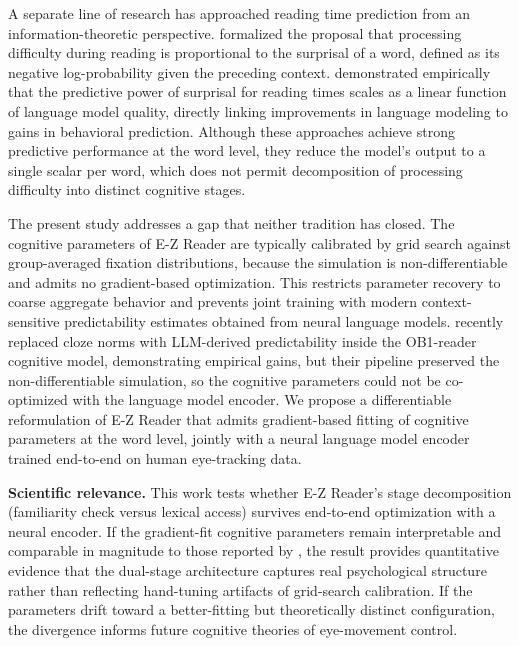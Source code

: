 \documentclass[12pt]{article}
\begin{document}
A separate line of research has approached reading time prediction from an
information-theoretic perspective. \citet{levy2008expectation} formalized the
proposal that processing difficulty during reading is proportional to the
surprisal of a word, defined as its negative log-probability given the
preceding context. \citet{goodkind2018predictive} demonstrated empirically
that the predictive power of surprisal for reading times scales as a linear
function of language model quality, directly linking improvements in language
modeling to gains in behavioral prediction. Although these approaches achieve
strong predictive performance at the word level, they reduce the model's output
to a single scalar per word, which does not permit decomposition of processing
difficulty into distinct cognitive stages.

The present study addresses a gap that neither tradition has closed. The
cognitive parameters of E-Z Reader are typically calibrated by grid search
against group-averaged fixation distributions, because the simulation is
non-differentiable and admits no gradient-based optimization. This restricts
parameter recovery to coarse aggregate behavior and prevents joint training
with modern context-sensitive predictability estimates obtained from neural
language models. \citet{lopesrego2024language} recently replaced cloze norms
with LLM-derived predictability inside the OB1-reader cognitive model,
demonstrating empirical gains, but their pipeline preserved the
non-differentiable simulation, so the cognitive parameters could not be
co-optimized with the language model encoder. We propose a differentiable
reformulation of E-Z Reader that admits gradient-based fitting of cognitive
parameters at the word level, jointly with a neural language model encoder
trained end-to-end on human eye-tracking data.

\noindent\textbf{Scientific relevance.} This work tests whether E-Z Reader's
stage decomposition (familiarity check versus lexical access) survives
end-to-end optimization with a neural encoder. If the gradient-fit cognitive
parameters remain interpretable and comparable in magnitude to those reported
by \citet{reichle1998toward}, the result provides quantitative evidence that
the dual-stage architecture captures real psychological structure rather than
reflecting hand-tuning artifacts of grid-search calibration. If the parameters
drift toward a better-fitting but theoretically distinct configuration, the
divergence informs future cognitive theories of eye-movement control.
\end{document}
